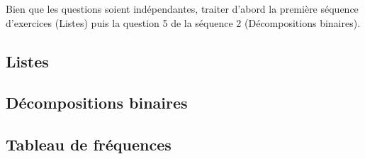 

\usepackage{parcolumns}
\setlength{\parindent}{0pt}

 
Bien que les questions soient indépendantes, traiter d'abord la première séquence d'exercices (Listes) puis la question 5 de la séquence 2 (Décompositions binaires).

\subsection{Listes}


\subsection{Décompositions binaires}


\subsection{Tableau de fréquences}


